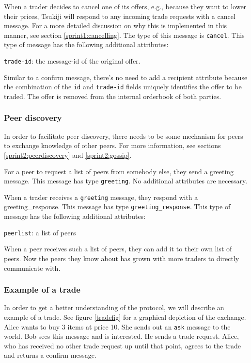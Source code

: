 When a trader decides to cancel one of its offers, e.g., because they want to lower their prices, Tsukiji will respond to any incoming trade requests with a cancel message.
For a more detailed discussion on why this is implemented in this manner, see section \ref{sprint1:cancelling}.
The type of this message is \texttt{cancel}.
This type of message has the following additional attributes:

\begin{myitemize}
\item \texttt{trade-id}: the message-id of the original offer.
\end{myitemize}

Similar to a confirm message, there's no need to add a recipient attribute because the combination of the \texttt{id} and \texttt{trade-id} fields uniquely identifies the offer to be traded.
The offer is removed from the internal orderbook of both parties.

\subsubsection{Peer discovery}

In order to facilitate peer discovery, there needs to be some mechanism for peers to exchange knowledge of other peers. For more information, see sections \ref{sprint2:peerdiscovery} and \ref{sprint2:gossip}.

For a peer to request a list of peers from somebody else, they send a greeting message.
This message has type \texttt{greeting}.
No additional attributes are necessary.

When a trader receives a \texttt{greeting} message, they respond with a greeting\_response.
This message has type \texttt{greeting\_response}.
This type of message has the following additional attributes:
\begin{myitemize}
\item \texttt{peerlist}: a list of peers
\end{myitemize}

When a peer receives such a list of peers, they can add it to their own list of peers.
Now the peers they know about has grown with more traders to directly communicate with.

\subsubsection{Example of a trade}
In order to get a better understanding of the protocol, we will describe an example of a trade. See figure \ref{tradefig} for a graphical depiction of the exchange.
Alice wants to buy 3 items at price 10.
She sends out an \texttt{ask} message to the world.
Bob sees this message and is interested.
He sends a trade request.
Alice, who has received no other trade request up until that point, agrees to the trade and returns a confirm message.

